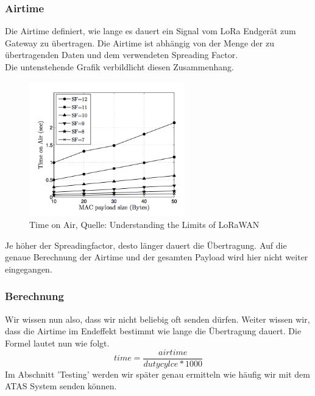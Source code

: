 \documentclass[11pt,english,german]{report}
\theoremstyle{definition}
\begin{document}
\subsubsection{Airtime}
Die Airtime definiert, wie lange es dauert ein Signal vom LoRa Endgerät zum Gateway zu übertragen. Die Airtime ist abhängig von der Menge der zu übertragenden Daten und dem verwendeten Spreading Factor.\\[0.3cm]
Die untenstehende Grafik verbildlicht diesen Zusammenhang.
\begin{figure}[H]
	\centering
	\includegraphics[width=0.6\textwidth]{img/lora/timeonair.png}
	\caption[Time on Air]
	{Time on Air, Quelle: Understanding the Limits of LoRaWAN \cite{loradatarate}}
\end{figure}
\noindent
Je höher der Spreadingfactor, desto länger dauert die Übertragung. Auf die genaue Berechnung der Airtime und der gesamten Payload wird hier nicht weiter eingegangen.

\subsubsection{Berechnung}
Wir wissen nun also, dass wir nicht beliebig oft senden dürfen. Weiter wissen wir, dass die Airtime im Endeffekt bestimmt wie lange die Übertragung dauert. Die Formel lautet nun wie folgt.
\begin{equation*}time = \frac{airtime}{dutycylce * 1000}\end{equation*}
Im Abschnitt 'Testing' werden wir später genau ermitteln wie häufig wir mit dem ATAS System senden können.

\newpage
\end{document}

